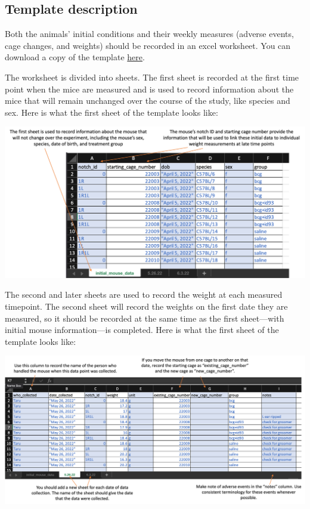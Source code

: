 \documentclass[
]{book}
\begin{document}
\hypertarget{template-description}{%
\subsection{Template description}\label{template-description}}

Both the animals' initial conditions and their weekly measures (adverse events,
cage changes, and weights) should be recorded in an excel worksheet. You can
download a copy of the template
\href{https://github.com/csu-impactb/CODING-TEAM-BOOKDOWN-/raw/main/templates/data_collection_templates/body_weights_template.xlsx}{here}.

The worksheet is divided into sheets. The first sheet is recorded at the first
time point when the mice are measured and is used to record information about
the mice that will remain unchanged over the course of the study, like species
and sex. Here is what the first sheet of the template looks like:

\includegraphics[width=1\linewidth]{figures/weight_template_initial}

The second and later sheets are used to record the weight at each measured timepoint.
The second sheet will record the weights on the first date they are measured, so
it should be recorded at the same time as the first sheet---with initial mouse
information---is completed. Here is what the first sheet of the template looks like:

\includegraphics[width=1\linewidth]{figures/weight_template_page}
\end{document}
